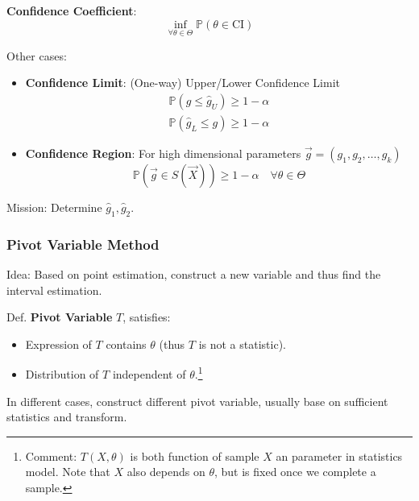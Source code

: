     \textbf{Confidence Coefficient}:
    \begin{equation}\inf_{\forall\theta\in\Theta}\mathbb{P}(
        \theta\in\mathrm{CI}
    )\end{equation}

    Other cases:
    \begin{itemize}[topsep=-4pt]
        \item \textbf{Confidence Limit}: (One-way) Upper/Lower Confidence Limit
    \begin{align}
        \mathbb{P}(g\leq \hat{g}_U)\geq 1-\alpha\\
        \mathbb{P}(\hat{g}_L\leq g)\geq 1-\alpha
    \end{align}
        \item \textbf{Confidence Region}: For high dimensional parameters $\vec{g}=(g_1,g_2,\ldots,g_k)$
        \begin{equation}\mathbb{P}(\vec{g}\in S(\vec{X}))\geq 1-\alpha\quad \forall \theta\in\Theta \end{equation}
        
    \end{itemize}

    Mission: Determine $\hat{g}_1,\hat{g}_2$.


\subsubsection{Pivot Variable Method}\label{SubSectionPivotVariableMethod}
    Idea: Based on point estimation, construct a new variable and thus find the interval estimation.

    Def. \textbf{Pivot Variable} $T$, satisfies: 
    \begin{itemize}[itemsep= -2 pt,parsep= -2 pt]
        \item Expression of $T$ contains $\theta$ (thus $T$ is not a statistic).
        \item Distribution of $T$ independent of $\theta$.\footnote{Comment: $ T(X,\theta ) $ is both function of sample $ X $ an parameter in statistics model. Note that $ X $ also depends on $ \theta  $, but is fixed once we complete a sample.}
    \end{itemize}

    In different cases, construct different pivot variable, usually base on sufficient statistics and transform.
    
